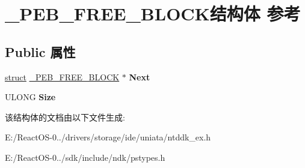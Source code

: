 \hypertarget{struct___p_e_b___f_r_e_e___b_l_o_c_k}{}\section{\+\_\+\+P\+E\+B\+\_\+\+F\+R\+E\+E\+\_\+\+B\+L\+O\+C\+K结构体 参考}
\label{struct___p_e_b___f_r_e_e___b_l_o_c_k}
\subsection*{Public 属性}
\begin{DoxyCompactItemize}
\item 
\mbox{\label{struct___p_e_b___f_r_e_e___b_l_o_c_k_a30990b4b9bd5d480d42e10316eefe00d}} 
\hyperlink{interfacestruct}{struct} \hyperlink{struct___p_e_b___f_r_e_e___b_l_o_c_k}{\+\_\+\+P\+E\+B\+\_\+\+F\+R\+E\+E\+\_\+\+B\+L\+O\+CK} $\ast$ {\bfseries Next}
\item 
\mbox{\label{struct___p_e_b___f_r_e_e___b_l_o_c_k_a9c766627173aa919e7bddcdc963df260}} 
U\+L\+O\+NG {\bfseries Size}
\end{DoxyCompactItemize}


该结构体的文档由以下文件生成\+:\begin{DoxyCompactItemize}
\item 
E\+:/\+React\+O\+S-\/0../drivers/storage/ide/uniata/ntddk\+\_\+ex.\+h\item 
E\+:/\+React\+O\+S-\/0../sdk/include/ndk/pstypes.\+h\end{DoxyCompactItemize}
